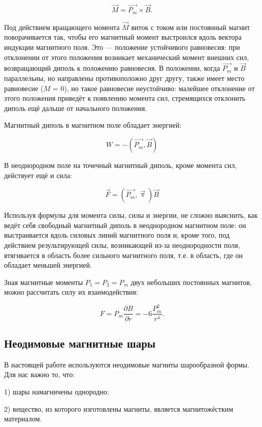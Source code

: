 \documentclass[a4paper, 12pt]{article}
\begin{document}
            $$
            \vec{M} = \overrightarrow{P_m}\times \vec{B}.
            $$

            Под действием вращающего момента $\vec{M}$ виток с током или постоянный магнит поворачивается так, чтобы его магнитный момент выстроился вдоль вектора индукции магнитного поля. Это — положение устойчивого равновесия: при отклонении от этого положения возникает механический момент внешних сил, возвращающий диполь к положению равновесия. В положении, когда $\overrightarrow{P_m}$ и $\vec{B}$ параллельны, но направлены противоположно друг другу, также имеет место равновесие ($M$ = 0), но такое равновесие неустойчиво: малейшее отклонение от этого положения приведёт к появлению момента сил, стремящихся отклонить диполь ещё дальше от начального положения.

            Магнитный диполь в магнитном поле обладает энергией:

            $$
            W = -(\overrightarrow{P_m},\vec{B})
            $$

            В неоднородном поле на точечный магнитный диполь, кроме момента сил, действует ещё и сила:

            $$
            \vec{F}=(\overrightarrow{P_m},\vec{\triangledown})\vec{B}
            $$

            Используя формулы для момента силы, силы и энергии, не сложно выяснить, как ведёт себя свободный магнитный диполь в неоднородном магнитном поле: он выстраивается вдоль силовых линий магнитного поля и, кроме того, под действием результирующей силы, возникающей из-за неоднородности поля, втягивается в область более сильного магнитного поля, т.е. в область, где он обладает меньшей энергией.

            Зная магнитные моменты $P_1 = P_2 = P_m$ двух небольших постоянных магнитов, можно рассчитать силу их взаимодействия:

            $$
            F = P_m \dfrac{\partial B}{\partial r}=-6\dfrac{P_m^2}{r^4}.
            $$

        \subsection{Неодимовые магнитные шары}
            В настоящей работе используются неодимовые магниты шарообразной формы. Для нас важно то, что:

            1) шары намагничены однородно;

            2) вещество, из которого изготовлены магниты, является магнитожёстким материалом.
\end{document}

